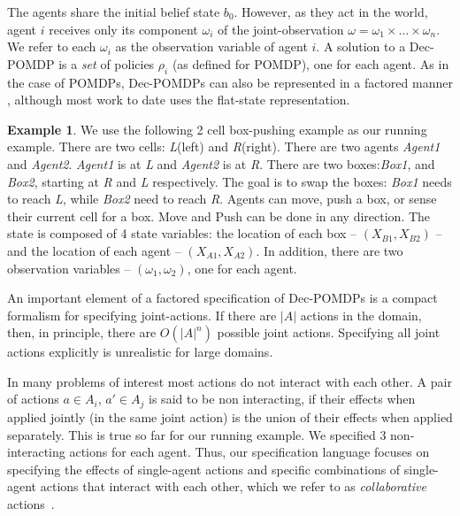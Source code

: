 \documentclass[letterpaper]{article}
\theoremstyle{definition}
\newtheorem{example}{Example}
\begin{document}
The agents share the initial belief state $b_0$. However, as they act in the world, agent $i$ receives only its component $\omega_i$ of the joint-observation $\omega = \omega_1 \times\ldots\times \omega_n$. We refer to each $\omega_i$ as the observation variable of agent $i$.
A solution to a Dec-POMDP is a \emph{set} of policies $\rho_i$ (as defined for POMDP), one for each agent.
As in the case of POMDPs, Dec-POMDPs can also be represented in a factored manner \cite{FDECPOMDP}, although most work to date uses the flat-state representation.

\begin{example}
We use the following 2 cell box-pushing example as our running example. There are two cells: \emph{L}(left) and \emph{R}(right).
There are two agents  \emph{Agent1} and \emph{Agent2}. 
\emph{Agent1} is at \emph{L} and \emph{Agent2} is at \emph{R}.
There are two boxes:\emph{Box1}, and \emph{Box2}, starting at \emph{R} and \emph{L} respectively.
The goal is to swap the boxes: \emph{Box1} needs to reach \emph{L}, while \emph{Box2} need to reach \emph{R}.
Agents can move, push a box, or sense their current cell for a box. Move and Push can be done in any direction. 
The state is composed of 4 state variables: the location of each box -- $(X_{B1}, X_{B2})$ -- and the location of each agent -- $(X_{A1}, X_{A2})$. In addition, there are two observation variables -- $(\omega_1, \omega_2)$, one for each agent.
\end{example}

An important element of a factored specification of Dec-POMDPs is a compact formalism for specifying joint-actions. If there are $|A|$ actions in the domain, then, in principle, there are $O(|A|^n)$ possible joint actions. Specifying all joint actions explicitly is unrealistic for large domains. 

In many problems of interest most actions do not interact with each other. A pair of actions $a\in A_i$, $a' \in A_j$ is said to be non interacting, if their effects when applied jointly (in the same joint action) is the union of their effects when applied separately.
This is true so far for our running example. We specified 3 non-interacting actions for each agent.
Thus, our specification language focuses on specifying
the effects of single-agent actions and specific
combinations of single-agent actions that interact with each other, which we refer to as {\em collaborative} actions~\cite{CPOR}.
\end{document}
